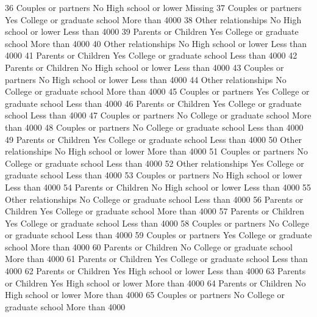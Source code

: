 \documentclass[
  letterpaper,
  DIV=11,
  numbers=noendperiod]{scrreprt}
\newenvironment{Shaded}{\begin{snugshade}}{\end{snugshade}}
\newcommand{\NormalTok}[1]{\textcolor[rgb]{0.00,0.23,0.31}{#1}}
\begin{document}
\begin{Shaded}
\begin{Highlighting}[]
\NormalTok{36  Couples or partners       No       High school or lower        Missing}
\NormalTok{37  Couples or partners      Yes College or graduate school More than 4000}
\NormalTok{38  Other relationships       No       High school or lower Less than 4000}
\NormalTok{39  Parents or Children      Yes College or graduate school More than 4000}
\NormalTok{40  Other relationships       No       High school or lower Less than 4000}
\NormalTok{41  Parents or Children      Yes College or graduate school Less than 4000}
\NormalTok{42  Parents or Children       No       High school or lower Less than 4000}
\NormalTok{43  Couples or partners       No       High school or lower Less than 4000}
\NormalTok{44  Other relationships       No College or graduate school More than 4000}
\NormalTok{45  Couples or partners      Yes College or graduate school Less than 4000}
\NormalTok{46  Parents or Children      Yes College or graduate school Less than 4000}
\NormalTok{47  Couples or partners       No College or graduate school More than 4000}
\NormalTok{48  Couples or partners       No College or graduate school Less than 4000}
\NormalTok{49  Parents or Children      Yes College or graduate school Less than 4000}
\NormalTok{50  Other relationships       No       High school or lower More than 4000}
\NormalTok{51  Couples or partners       No College or graduate school Less than 4000}
\NormalTok{52  Other relationships      Yes College or graduate school Less than 4000}
\NormalTok{53  Couples or partners       No       High school or lower Less than 4000}
\NormalTok{54  Parents or Children       No       High school or lower Less than 4000}
\NormalTok{55  Other relationships       No College or graduate school Less than 4000}
\NormalTok{56  Parents or Children      Yes College or graduate school More than 4000}
\NormalTok{57  Parents or Children      Yes College or graduate school Less than 4000}
\NormalTok{58  Couples or partners       No College or graduate school Less than 4000}
\NormalTok{59  Couples or partners      Yes College or graduate school More than 4000}
\NormalTok{60  Parents or Children       No College or graduate school More than 4000}
\NormalTok{61  Parents or Children      Yes College or graduate school Less than 4000}
\NormalTok{62  Parents or Children      Yes       High school or lower Less than 4000}
\NormalTok{63  Parents or Children      Yes       High school or lower More than 4000}
\NormalTok{64  Parents or Children       No       High school or lower More than 4000}
\NormalTok{65  Couples or partners       No College or graduate school More than 4000}

\end{Highlighting}
\end{Shaded}
\end{document}
